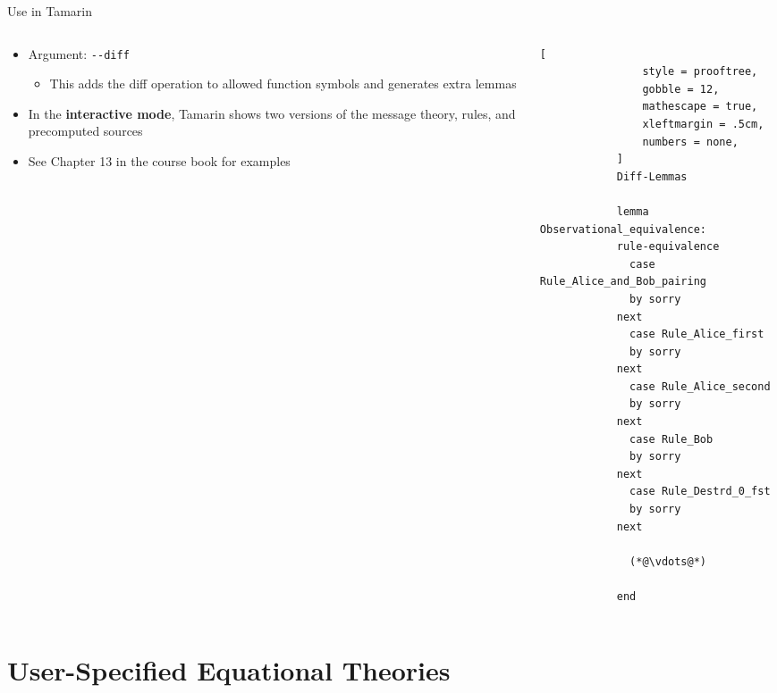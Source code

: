 \documentclass[11pt,aspectratio=169]{beamer}
\begin{document}
\begin{frame}[fragile]{Use in Tamarin}
    \begin{columns}
        \begin{column}{0.5\textwidth}
            \begin{itemize}
                \item Argument: \verb|--diff|
                \begin{itemize}
                    \item This adds the diff operation to allowed function 
                          symbols and generates extra lemmas
                \end{itemize}
                \item In the \textbf{interactive mode}, Tamarin shows two 
                      versions of the message theory, rules, and precomputed 
                      sources
                \item See Chapter 13 in the course book for examples
            \end{itemize}
        \end{column}
        \begin{column}{0.5\textwidth}
            \begin{lstlisting}[
                style = prooftree,
                gobble = 12,
                mathescape = true,
                xleftmargin = .5cm,
                numbers = none,
            ]
            Diff-Lemmas

            lemma Observational_equivalence:
            rule-equivalence
              case Rule_Alice_and_Bob_pairing
              by sorry
            next
              case Rule_Alice_first
              by sorry
            next
              case Rule_Alice_second
              by sorry
            next
              case Rule_Bob
              by sorry
            next
              case Rule_Destrd_0_fst
              by sorry
            next

              (*@\vdots@*)

            end
            \end{lstlisting}
        \end{column}
    \end{columns}
    \vsep
\end{frame}


\section{User-Specified Equational Theories}
\end{document}
